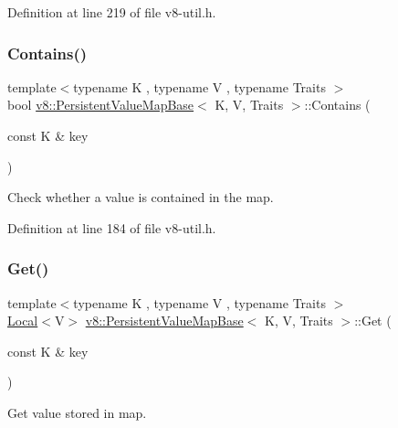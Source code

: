 Definition at line 219 of file v8-\/util.\+h.

\mbox{\label{classv8_1_1PersistentValueMapBase_a8c68e5f99c4042541c6d32232c97282a}} 
\subsubsection{\texorpdfstring{Contains()}{Contains()}}
{\footnotesize\ttfamily template$<$typename K , typename V , typename Traits $>$ \\
bool \mbox{\hyperlink{classv8_1_1PersistentValueMapBase}{v8\+::\+Persistent\+Value\+Map\+Base}}$<$ K, V, Traits $>$\+::Contains (\begin{DoxyParamCaption}\item[{const K \&}]{key }\end{DoxyParamCaption})\hspace{0.3cm}{\ttfamily [inline]}}

Check whether a value is contained in the map. 

Definition at line 184 of file v8-\/util.\+h.

\mbox{\label{classv8_1_1PersistentValueMapBase_a16b8f906ea42036c2f37d44813bf2a72}} 
\subsubsection{\texorpdfstring{Get()}{Get()}}
{\footnotesize\ttfamily template$<$typename K , typename V , typename Traits $>$ \\
\mbox{\hyperlink{classv8_1_1Local}{Local}}$<$V$>$ \mbox{\hyperlink{classv8_1_1PersistentValueMapBase}{v8\+::\+Persistent\+Value\+Map\+Base}}$<$ K, V, Traits $>$\+::Get (\begin{DoxyParamCaption}\item[{const K \&}]{key }\end{DoxyParamCaption})\hspace{0.3cm}{\ttfamily [inline]}}

Get value stored in map. 

